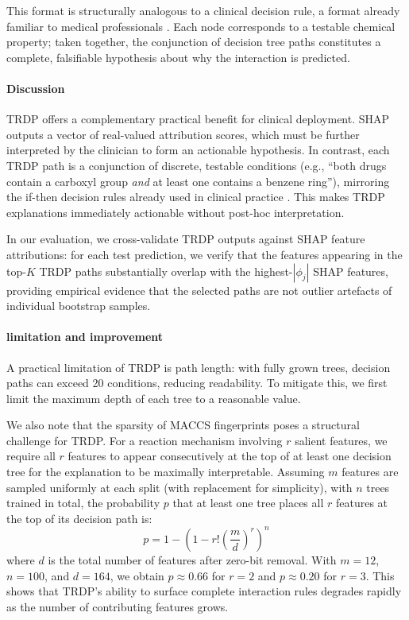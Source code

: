 \documentclass[letterpaper]{article} %
\begin{document}
This format is structurally analogous to a clinical decision rule, a format already familiar to medical professionals \cite{Rudin2019}. Each node corresponds to a testable chemical property; taken together, the conjunction of decision tree paths constitutes a complete, falsifiable hypothesis about why the interaction is predicted.

\paragraph{Discussion}
TRDP offers a complementary practical benefit for clinical deployment. SHAP outputs a vector of real-valued attribution scores, which must be further interpreted by the clinician to form an actionable hypothesis. In contrast, each TRDP path is a conjunction of discrete, testable conditions (e.g., ``both drugs contain a carboxyl group \emph{and} at least one contains a benzene ring''), mirroring the if-then decision rules already used in clinical practice \cite{Rudin2019}. This makes TRDP explanations immediately actionable without post-hoc interpretation.


In our evaluation, we cross-validate TRDP outputs against SHAP feature attributions: for each test prediction, we verify that the features appearing in the top-$K$ TRDP paths substantially overlap with the highest-$|\phi_j|$ SHAP features, providing empirical evidence that the selected paths are not outlier artefacts of individual bootstrap samples.

\paragraph{limitation and improvement} 

A practical limitation of TRDP is path length: with fully grown trees, decision paths can exceed 20 conditions, reducing readability. To mitigate this, we first limit the maximum depth of each tree to a reasonable value. 

We also note that the sparsity of MACCS fingerprints poses a structural challenge for TRDP. For a reaction mechanism involving $r$ salient features, we require all $r$ features to appear consecutively at the top of at least one decision tree for the explanation to be maximally interpretable. Assuming $m$ features are sampled uniformly at each split (with replacement for simplicity), with $n$ trees trained in total, the probability $p$ that at least one tree places all $r$ features at the top of its decision path is:
\begin{equation}
   p = 1 - \left(1 - r! \left(\frac{m}{d}\right)^{r}\right)^{n}
\end{equation}
where $d$ is the total number of features after zero-bit removal. With $m = 12$, $n = 100$, and $d = 164$, we obtain $p \approx 0.66$ for $r = 2$ and $p \approx 0.20$ for $r = 3$. This shows that TRDP's ability to surface complete interaction rules degrades rapidly as the number of contributing features grows.
\end{document}
